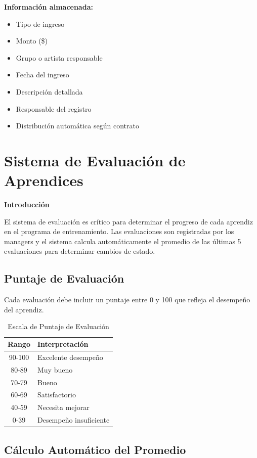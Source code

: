 \documentclass[12pt,a4paper,spanish,oneside]{report}
\begin{document}
\textbf{Información almacenada:}
\begin{itemize}
\item Tipo de ingreso
\item Monto (\$)
\item Grupo o artista responsable
\item Fecha del ingreso
\item Descripción detallada
\item Responsable del registro
\item Distribución automática según contrato
\end{itemize}

\section{Sistema de Evaluación de Aprendices}

\textbf{Introducción}

El sistema de evaluación es crítico para determinar el progreso de cada aprendiz en el programa de entrenamiento. Las evaluaciones son registradas por los managers y el sistema calcula automáticamente el promedio de las últimas 5 evaluaciones para determinar cambios de estado.

\subsection{Puntaje de Evaluación}

Cada evaluación debe incluir un puntaje entre 0 y 100 que refleja el desempeño del aprendiz.

\begin{table}[H]
\centering
\caption{Escala de Puntaje de Evaluación}
\begin{tabular}{|c|p{8cm}|}
\hline
\textbf{Rango} & \textbf{Interpretación} \\
\hline
90-100 & Excelente desempeño \\
\hline
80-89 & Muy bueno \\
\hline
70-79 & Bueno \\
\hline
60-69 & Satisfactorio \\
\hline
40-59 & Necesita mejorar \\
\hline
0-39 & Desempeño insuficiente \\
\hline
\end{tabular}
\end{table}

\subsection{Cálculo Automático del Promedio}
\end{document}
